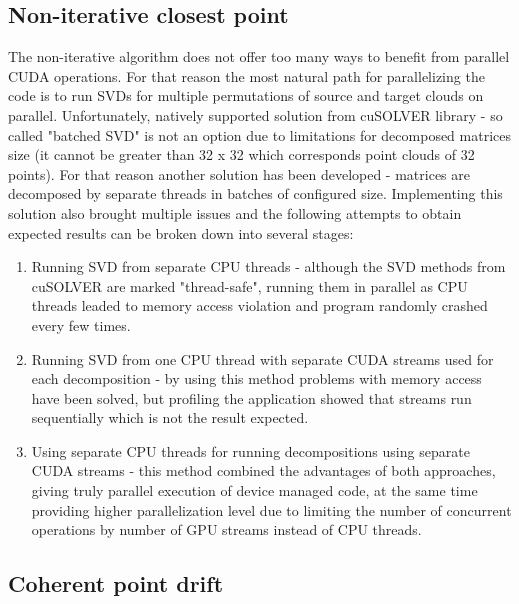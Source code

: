 \documentclass[titlepage]{article}
\begin{document}
\subsection{Non-iterative closest point}
The non-iterative algorithm does not offer too many ways to benefit from parallel CUDA operations. For that reason the most natural path for parallelizing the code is to run SVDs for multiple permutations of source and target clouds on parallel. Unfortunately, natively supported solution from cuSOLVER library - so called "batched SVD" is not an option due to limitations for decomposed matrices size (it cannot be greater than 32 x 32 which corresponds point clouds of 32 points). For that reason another solution has been developed - matrices are decomposed by separate threads in batches of configured size. Implementing this solution also brought multiple issues and the following attempts to obtain expected results can be broken down into several stages:
\begin{enumerate}
\item Running SVD from separate CPU threads - although the SVD methods from cuSOLVER are marked "thread-safe", running them in parallel as CPU threads leaded to memory access violation and program randomly crashed every few times.
\item Running SVD from one CPU thread with separate CUDA streams used for each decomposition - by using this method problems with memory access have been solved, but profiling the application showed that streams run sequentially which is not the result expected.
\item Using separate CPU threads for running decompositions using separate CUDA streams - this method combined the advantages of both approaches, giving truly parallel execution of device managed code, at the same time providing higher parallelization level due to limiting the number of concurrent operations by number of GPU streams instead of CPU threads.
\end{enumerate}

\subsection{Coherent point drift}
\end{document}

